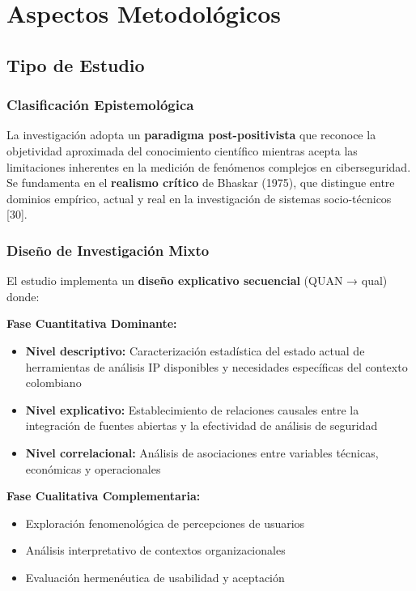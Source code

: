 \section{Aspectos Metodológicos}

\subsection{Tipo de Estudio}

\subsubsection{Clasificación Epistemológica}
La investigación adopta un \textbf{paradigma post-positivista} que reconoce la objetividad aproximada del conocimiento científico mientras acepta las limitaciones inherentes en la medición de fenómenos complejos en ciberseguridad. Se fundamenta en el \textbf{realismo crítico} de Bhaskar (1975), que distingue entre dominios empírico, actual y real en la investigación de sistemas socio-técnicos [30].

\subsubsection{Diseño de Investigación Mixto}
El estudio implementa un \textbf{diseño explicativo secuencial} (QUAN → qual) donde:

\textbf{Fase Cuantitativa Dominante:}
\begin{itemize}
    \item \textbf{Nivel descriptivo:} Caracterización estadística del estado actual de herramientas de análisis IP disponibles y necesidades específicas del contexto colombiano
    \item \textbf{Nivel explicativo:} Establecimiento de relaciones causales entre la integración de fuentes abiertas y la efectividad de análisis de seguridad
    \item \textbf{Nivel correlacional:} Análisis de asociaciones entre variables técnicas, económicas y operacionales
\end{itemize}

\textbf{Fase Cualitativa Complementaria:}
\begin{itemize}
    \item Exploración fenomenológica de percepciones de usuarios
    \item Análisis interpretativo de contextos organizacionales
    \item Evaluación hermenéutica de usabilidad y aceptación
\end{itemize}

